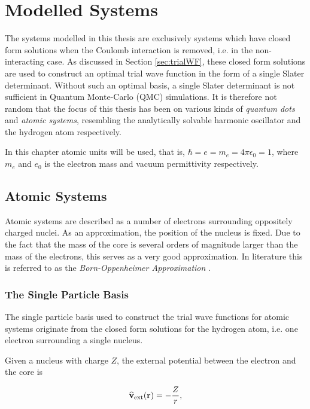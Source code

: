 \chapter{Modelled Systems}
\label{ch:modelledSystems}

The systems modelled in this thesis are exclusively systems which have closed form solutions when the Coulomb interaction is removed, i.e. in the non-interacting case. As discussed in Section \ref{sec:trialWF}, these closed form solutions are used to construct an optimal trial wave function in the form of a single Slater determinant. Without such an optimal basis, a single Slater determinant is not sufficient in Quantum Monte-Carlo (QMC) simulations. It is therefore not random that the focus of this thesis has been on various kinds of \textit{quantum dots} and \textit{atomic systems}, resembling the analytically solvable harmonic oscillator and the hydrogen atom respectively.

In this chapter atomic units will be used, that is, $\hbar=e=m_e=4\pi\epsilon_0 = 1$, where $m_e$ and $e_0$ is the electron mass and vacuum permittivity respectively.

\section{Atomic Systems}

Atomic systems are described as a number of electrons surrounding oppositely charged nuclei. As an approximation, the position of the nucleus is fixed. Due to the fact that the mass of the core is several orders of magnitude larger than the mass of the electrons, this serves as a very good approximation. In literature this is referred to as the \textit{Born-Oppenheimer Approximation} \cite{Sakurai:94}.

\subsection{The Single Particle Basis}

The single particle basis used to construct the trial wave functions for atomic systems originate from the closed form solutions for the hydrogen atom, i.e. one electron surrounding a single nucleus.

Given a nucleus with charge $Z$, the external potential between the electron and the core is

\begin{equation}
 {\bf\widehat{v}}_\mathrm{ext}(\mathbf{r}) = -\frac{Z}{r}, \label{eq:v0hydro}
\end{equation}


